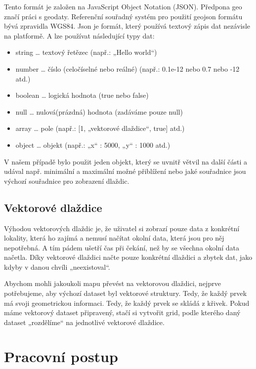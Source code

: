 \documentclass[12pt]{article}
\begin{document}
Tento formát je založen na JavaScript Object Notation (JSON). Předpona geo značí práci s geodaty. Referenční souřadný systém pro použití geojson formátu bývá zpravidla WGS84. Json je formát, který používá textový zápis dat nezávisle na platformě. A lze používat následující typy dat:

\begin{itemize}
	\item string … textový řetězec (např.: „Hello world“)
	\item number … číslo (celočíselné nebo reálné) (např.: 0.1e-12 nebo 0.7 nebo -12 atd.)
	\item boolean … logická hodnota (true nebo false)
	\item null … nulová(prázdná) hodnota (zadáváme pouze null)
	\item array … pole (např.: [1, „vektorové dlaždice“, true] atd.)
	\item object … objekt (např.: {„x“ : 5000, „y“ : 1000} atd.)
\end{itemize}

V našem případě bylo použit jeden objekt, který se uvnitř větvil na další části a udával např. minimální a maximální možné přiblížení nebo jaké souřadnice jsou výchozí souřadnice pro zobrazení dlaždic.

\subsection{Vektorové dlaždice}
Výhodou vektorových dlaždic je, že uživatel si zobrazí pouze data z konkrétní lokality, která ho zajímá a nemusí načítat okolní data, která jsou pro něj nepotřebná. A tím pádem ušetří čas při čekání, než by se všechna okolní data načetla. Díky vektorové dlaždici načte pouze konkrétní dlaždici a zbytek dat, jako kdyby v danou chvíli „neexistoval“.

Abychom mohli jakoukoli mapu převést na vektorovou dlaždici, nejprve potřebujeme, aby výchozí dataset byl vektorové struktury. Tedy, že každý prvek má svoji geometrickou informaci. Tedy, že každý prvek se skládá z křivek. Pokud máme vektorový dataset připravený, stačí si vytvořit grid, podle kterého daný dataset „rozdělíme“ na jednotlivé vektorové dlaždice.

\clearpage 
\section{Pracovní postup}
\end{document}
